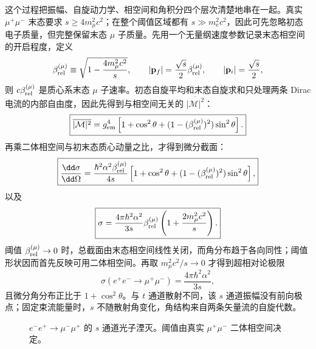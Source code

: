 这个过程把振幅、自旋动力学、相空间和角积分四个层次清楚地串在一起。真实 $\mu^+\mu^-$ 末态要求 $s\ge4m_\mu^2c^2$；在整个阈值区域都有 $s\gg m_{\mathrm e}^2c^2$，因此可先忽略初态电子质量，但完整保留末态 $\mu$ 子质量。先用一个无量纲速度参数记录末态相空间的开启程度，定义
\begin{equation}
 \beta_{\rm rel}^{(\mu)}
 \equiv\sqrt{1-\frac{4m_\mu^2c^2}{s}},
 \qquad
 |\mathbf p_f|=\frac{\sqrt s}{2}\beta_{\rm rel}^{(\mu)},
 \qquad
 |\mathbf p_i|=\frac{\sqrt s}{2},
 \label{eq:mumu-beta-si-r10}
\end{equation}
则 $c\beta_{\rm rel}^{(\mu)}$ 是质心系末态 $\mu$ 子速率。初态自旋平均和末态自旋求和只处理两条 Dirac 电流的内部自由度，因此先得到与相空间无关的 $\overline{|\mathcal M|^2}$：
\begin{equation}
 \boxed{
 \overline{|\mathcal M|^2}
 =g_{\rm em}^4\left[
 1+\cos^2\theta
 +(1-(\beta_{\rm rel}^{(\mu)})^2)\sin^2\theta
 \right].}
 \label{eq:mumu-M2-massive-angle-si-r10}
\end{equation}
再乘二体相空间与初末态质心动量之比，才得到微分截面：
\begin{equation}
 \boxed{
 \frac{\dd\sigma}{\dd\Omega}
 =\frac{\hbar^2\alpha^2\beta_{\rm rel}^{(\mu)}}{4s}
 \left[
 1+\cos^2\theta
 +(1-(\beta_{\rm rel}^{(\mu)})^2)\sin^2\theta
 \right],}
 \label{eq:mumu-dsigma-massive-si-r10}
\end{equation}
以及
\begin{equation}
 \boxed{
 \sigma
 =\frac{4\pi\hbar^2\alpha^2}{3s}
 \beta_{\rm rel}^{(\mu)}\left(1+\frac{2m_\mu^2c^2}{s}\right).}
 \label{eq:mumu-total-massive-si-r10}
\end{equation}
阈值 $\beta_{\rm rel}^{(\mu)}\to0$ 时，总截面由末态相空间线性关闭，而角分布趋于各向同性；阈值形状因而首先反映可用二体相空间。再取 $m_\mu^2c^2/s\to0$ 才得到超相对论极限
\begin{equation}
 \boxed{
 \sigma(e^+e^-\to\mu^+\mu^-)
 =\frac{4\pi\hbar^2\alpha^2}{3s},}
 \label{eq:ee-mumu-total}
\end{equation}
且微分角分布正比于 $1+\cos^2\theta$。与 $t$ 通道散射不同，该 $s$ 通道振幅没有前向极点；固定束流能量时，$s$ 不随散射角变化，角结构来自两条矢量流的自旋代数。

\begin{figure}[htbp]
 \centering
 
 \caption{$e^-e^+\to\mu^-\mu^+$ 的 $s$ 通道光子湮灭。阈值由真实 $\mu^+\mu^-$ 二体相空间决定。}
 \label{fig:ee-mumu}
\end{figure}

